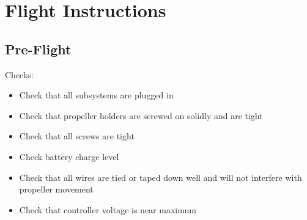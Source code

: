 \documentclass{article}
\begin{document}
\section{Flight Instructions}
\subsection{Pre-Flight}
Checks:
\begin{itemize}
\item Check that all subsystems are plugged in
\item Check that propeller holders are screwed on solidly and are tight
\item Check that all screws are tight
\item Check battery charge level
\item Check that all wires are tied or taped down well and will not interfere with propeller movement
\item Check that controller voltage is near maximum
\end{itemize}
\end{document}
